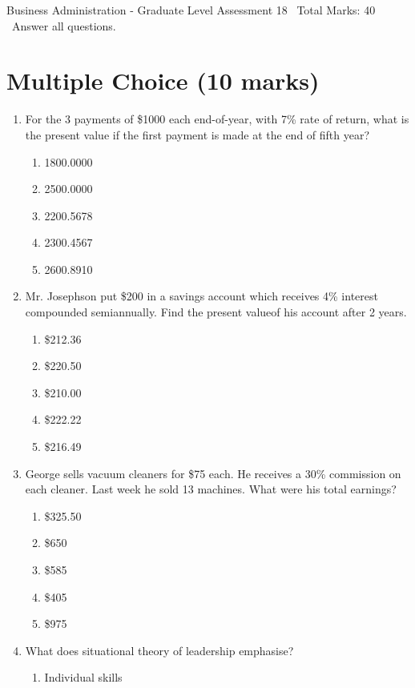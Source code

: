 \documentclass[12pt]{article}
\begin{document}
\begin{center}
Business Administration - Graduate Level Assessment 18 \
Total Marks: 40 \
Answer all questions.
\end{center}

\section*{Multiple Choice (10 marks)}
\begin{enumerate}[label=\arabic*.]
\item For the 3 payments of \$1000 each end-of-year, with 7\% rate of return, what is the present value if the first payment is made at the end of fifth year?
\begin{enumerate}[label=(\alph*)]
    \item 1800.0000
    \item 2500.0000
    \item 2200.5678
    \item 2300.4567
    \item 2600.8910
\end{enumerate}
\item Mr. Josephson put \$200 in a savings account which receives 4\% interest compounded semiannually. Find the present valueof his account after 2 years.
\begin{enumerate}[label=(\alph*)]
    \item \$212.36
    \item \$220.50
    \item \$210.00
    \item \$222.22
    \item \$216.49
\end{enumerate}
\item George sells vacuum cleaners for \$75 each. He receives a 30\% commission on each cleaner. Last week he sold 13 machines. What were his total earnings?
\begin{enumerate}[label=(\alph*)]
    \item \$325.50
    \item \$650
    \item \$585
    \item \$405
    \item \$975
\end{enumerate}
\item What does situational theory of leadership emphasise?
\begin{enumerate}[label=(\alph*)]
    \item Individual skills

\end{enumerate}
\end{enumerate}
\end{document}
